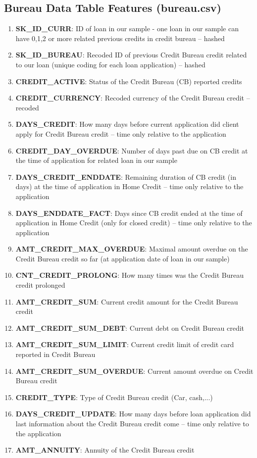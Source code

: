 \documentclass[12pt, letterpaper]{article}
\begin{document}
\begin{appendices}
\subsection{Bureau Data Table Features (bureau.csv)}
\label{bureaudatatablefeatures}
\begin{enumerate}
  \item \textbf{SK_ID_CURR}: ID of loan in our sample - one loan in our sample can have 0,1,2 or more related previous credits in credit bureau -- hashed
  \item \textbf{SK_ID_BUREAU}: Recoded ID of previous Credit Bureau credit related to our loan (unique coding for each loan application) -- hashed
  \item \textbf{CREDIT_ACTIVE}: Status of the Credit Bureau (CB) reported credits
  \item \textbf{CREDIT_CURRENCY}: Recoded currency of the Credit Bureau credit -- recoded
  \item \textbf{DAYS_CREDIT}: How many days before current application did client apply for Credit Bureau credit -- time only relative to the application
  \item \textbf{CREDIT_DAY_OVERDUE}: Number of days past due on CB credit at the time of application for related loan in our sample
  \item \textbf{DAYS_CREDIT_ENDDATE}: Remaining duration of CB credit (in days) at the time of application in Home Credit -- time only relative to the application
  \item \textbf{DAYS_ENDDATE_FACT}: Days since CB credit ended at the time of application in Home Credit (only for closed credit) -- time only relative to the application
  \item \textbf{AMT_CREDIT_MAX_OVERDUE}: Maximal amount overdue on the Credit Bureau credit so far (at application date of loan in our sample)
  \item \textbf{CNT_CREDIT_PROLONG}: How many times was the Credit Bureau credit prolonged
  \item \textbf{AMT_CREDIT_SUM}: Current credit amount for the Credit Bureau credit
  \item \textbf{AMT_CREDIT_SUM_DEBT}: Current debt on Credit Bureau credit
  \item \textbf{AMT_CREDIT_SUM_LIMIT}: Current credit limit of credit card reported in Credit Bureau
  \item \textbf{AMT_CREDIT_SUM_OVERDUE}: Current amount overdue on Credit Bureau credit
  \item \textbf{CREDIT_TYPE}: Type of Credit Bureau credit (Car, cash,...)
  \item \textbf{DAYS_CREDIT_UPDATE}: How many days before loan application did last information about the Credit Bureau credit come -- time only relative to the application
  \item \textbf{AMT_ANNUITY}: Annuity of the Credit Bureau credit
\end{enumerate}


\end{appendices}
\end{document}
